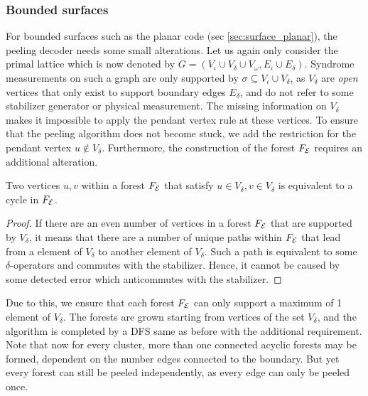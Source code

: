 \subsubsection{Bounded surfaces}
For bounded surfaces such as the planar code (sec \ref{sec:surface_planar}), the peeling decoder needs some small alterations. Let us again only consider the primal lattice which is now denoted by $G = (V_\iota\cup V_{\delta} \cup V_{\omega}, E_\iota \cup E_{\delta})$. Syndrome measurements on such a graph are only supported by $\sigma \subseteq V_\iota\cup V_\delta$, as $V_\delta$ are \emph{open} vertices that only exist to support boundary edges $E_\delta$, and do not refer to some stabilizer generator or physical measurement. The missing information on $V_\delta$ makes it impossible to apply the pendant vertex rule at these vertices. To ensure that the peeling algorithm does not become stuck, we add the restriction for the pendant vertex $u \notin V_\delta$. Furthermore, the construction of the forest $F_{\mathcal{E}}$ requires an additional alteration.
\begin{lemma}
  Two vertices $u,v$ within a forest $F_{\mathcal{E}}$ that satisfy $u\in V_\delta, v \in V_\delta$ is equivalent to a cycle in $F_{\mathcal{E}}$. 
\end{lemma}
\begin{proof}
  If there are an even number of vertices in a forest $F_{\mathcal{E}}$ that are supported by $V_\delta$, it means that there are a number of unique paths within $F_{\mathcal{E}}$ that lead from a element of $V_\delta$ to another element of $V_\delta$. Such a path is equivalent to some $\delta$-operators and commutes with the stabilizer. Hence, it cannot be caused by some detected error which anticommutes with the stabilizer.
\end{proof}
Due to this, we ensure that each forest $F_{\mathcal{E}}$ can only support a maximum of 1 element of $V_\delta$. The forests are grown starting from vertices of the set $V_\delta$, and the algorithm is completed by a DFS same as before with the additional requirement. Note that now for every cluster, more than one connected acyclic forests may be formed, dependent on the number edges connected to the boundary. But yet every forest can still be peeled independently, as every edge can only be peeled once. 

